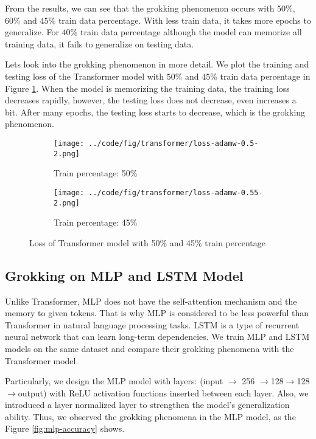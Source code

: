 \documentclass{article}
\begin{document}
From the results, we can see that the grokking phenomenon occurs with $50\%$, $60\%$ and $45\%$ train data percentage. With less train data, it takes more epochs to generalize. For $40\%$ train data percentage although the model can memorize all training data, it fails to generalize on testing data.

Lets look into the grokking phenomenon in more detail. We plot the training and testing loss of the Transformer model with $50\%$ and $45\%$ train data percentage in Figure \ref{fig:transformer-loss}. When the model is memorizing the training data, the training loss decreases rapidly, however, the testing loss does not decrease, even increases a bit. After many epochs, the testing loss starts to decrease, which is the grokking phenomenon.

\begin{figure}[ht]
    \centering
    \begin{subfigure}{0.45\textwidth}
        \texttt{[image: ../code/fig/transformer/loss-adamw-0.5-2.png]}
        \caption{Train percentage: 50\%}
    \end{subfigure}
    \begin{subfigure}{0.45\textwidth}
        \texttt{[image: ../code/fig/transformer/loss-adamw-0.55-2.png]}
        \caption{Train percentage: 45\%}
    \end{subfigure}
    \caption{Loss of Transformer model with 50\% and 45\% train percentage}
    \label{fig:transformer-loss}
\end{figure}

\subsection{Grokking on MLP and LSTM Model}

Unlike Transformer, MLP does not have the self-attention mechanism and the memory to given tokens. That is why MLP is considered to be less powerful than Transformer in natural language processing tasks. LSTM is a type of recurrent neural network that can learn long-term dependencies. We train MLP and LSTM models on the same dataset and compare their grokking phenomena with the Transformer model.

Particularly, we design the MLP model with layers: (input $\rightarrow$ 256 $\rightarrow $128$ \rightarrow $128$ \rightarrow $output) with ReLU activation functions inserted between each layer. Also, we introduced a layer normalized layer to strengthen the model's generalization ability. Thus, we observed the grokking phenomena in the MLP model, as the Figure \ref{fig:mlp-accuracy} shows.
\end{document}
